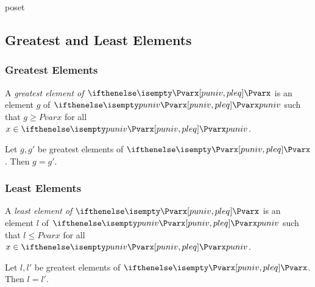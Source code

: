 \documentclass{stex}
\begin{document}
\begin{smodule}{poset}
  \subsection{Greatest and Least Elements}

  \subsubsection{Greatest Elements}

  \begin{forthel}
    \begin{definition}
      A \emph{greatest element of $\Pvar{}$} is an element $g$ of $\univ{Pvar}$ such that $g \geq{Pvar} x$ for all $x \in \univ{Pvar}$.
    \end{definition}

    \begin{proposition}
      Let $g, g'$ be greatest elements of $\Pvar{}$.
      Then $g = g'$.
    \end{proposition}
  \end{forthel}

  \subsubsection{Least Elements}

  \begin{forthel}
    \begin{definition}
      A \emph{least element of $\Pvar{}$} is an element $l$ of $\univ{Pvar}$ such that $l \leq{Pvar} x$ for all $x \in \univ{Pvar}$.
    \end{definition}

    \begin{proposition}
      Let $l, l'$ be greatest elements of $\Pvar{}$.
      Then $l = l'$.
    \end{proposition}
  \end{forthel}
\end{smodule}
\end{document}
